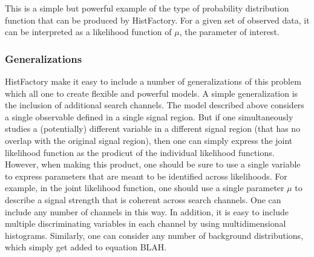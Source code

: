 
This is a simple but powerful example of the type of probability distribution function that can be produced by HistFactory.
For a given set of observed data, it can be interpreted as a likelihood function of $\mu$, the parameter of interest.


\subsubsection{Generalizations}

HistFactory make it easy to include a number of generalizations of this problem which all one to create flexible and powerful models.
A simple generalization is the inclusion of additional search channels.
The model described above considers a single observable defined in a single signal region.
But if one simultaneously studies a (potentially) different variable in a different signal region (that has no overlap with the original signal region), then one can simply express the joint likelihood function as the prodicut of the individual likelihood functions.
However, when making this product, one should be sure to use a single variable to express parameters that are meant to be identified across likelihoods.
For example, in the joint likelihood function, one should use a single parameter $\mu$ to describe a signal strength that is coherent across search channels.
One can include any number of channels in this way.
In addition, it is easy to include multiple discriminating variables in each channel by using multidimensional histograms.
Similarly, one can consider any number of background distributions, which simply get added to equation BLAH.

